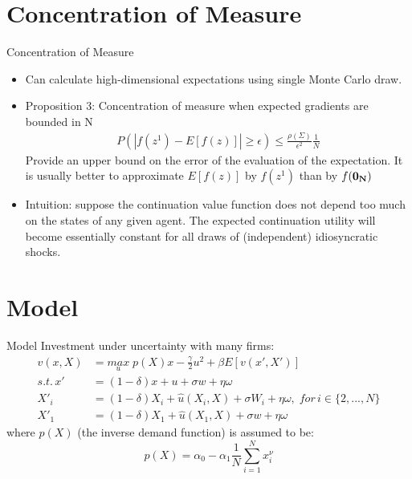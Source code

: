 \documentclass[dvipsnames,mathserif]{beamer}
\begin{document}
{\section{Concentration of Measure}
\begin{frame}{Concentration of Measure}
    \begin{itemize}
        \item Can calculate high-dimensional expectations using single Monte Carlo draw.\\ 
        \vspace{0.1cm}
        \item Proposition 3: Concentration of measure when expected gradients are bounded in N
        \begin{align*}
        P(|f(z^1) - E[f(z)]| \geq \epsilon) \leq \frac{\rho(\Sigma)}{\epsilon^2}\frac{1}{N}
        \end{align*}
        Provide an upper bound on the error of the evaluation of the expectation. 
        It is usually better to approximate $E [f (z)]$ by $f (z^1)$ than by $f(\bf{0}_N)$
        \vspace{0.2cm}
        \item Intuition: suppose the continuation value function does not depend too much on the states of any given agent. The expected continuation utility will become essentially constant for all draws of (independent) idiosyncratic shocks.
    \end{itemize}
\end{frame}

\section{Model}
\begin{frame}{Model}
Investment under uncertainty with many firms:\\
    \begin{align*}
    v(x,X) & = \underset{u}{max}\;{p(X)x - \frac{\gamma}{2}u^2 + \beta E[v(x',X')]}\\
    s.t. \, x'&= (1-\delta)x + u + \sigma w + \eta \omega\\
    X'_{i} &= (1-\delta)X_{i} + \hat{u}(X_{i},X) + \sigma W_{i} + \eta \omega, \; for \, i\in\{2,...,N\}\\
    X'_1 &= (1-\delta)X_1 + \hat{u}(X_1,X) + \sigma w + \eta \omega
    \end{align*}
    where $p(X)$ (the inverse demand function) is assumed to be: \[p(X) = \alpha_0 - \alpha_1\frac{1}{N}\sum_{i=1}^{N}x_i^{\nu}\]
\end{frame}

}
\end{document}
